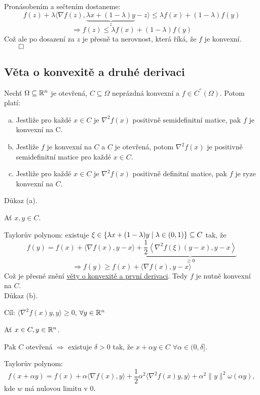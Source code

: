 Pronásobením a sečtením dostaneme:
\[
    f(z) + \lambda \langle \nabla f(z), \underbrace{\lambda x + (1-\lambda)y}_{z} - z\rangle \leq \lambda f(x) + 
    (1-\lambda)f(y)
\]
\[
    \Rightarrow f(z) \leq \lambda f(x) + (1-\lambda)f(y)
\]
Což ale po dosazení za $z$ je přesně ta nerovnost, která říká, že $f$ je konvexní. $\qed$

\subsection{Věta o konvexitě a druhé derivaci}\label{konvDDeriv}
Nechť $\Omega \subseteq \mathbb{R}^n$ je otevřená, $C \subseteq \Omega$ neprázdná konvexní a $f \in C^{''} (\Omega)$. Potom platí:
\begin{enumerate}[(a)]
    \item Jestliže pro každé $x \in C$ je $\nabla^2 f(x)$ positivně semidefinitní matice, pak $f$ je konvexní na C.
    \item Jestliže $f$ je konvexní na $C$ a $C$ je otevřená, potom $\nabla^2 f(x)$ je positivně semidefinitní matice pro 
    každé $x \in C$.
    \item Jestliže pro každé $x \in C$ je $\nabla^2 f(x)$ positivně definitní matice, pak $f$ je ryze konvexní na $C$. 
\end{enumerate}

Důkaz (a).

Ať $x, y \in C$.

Taylorův polynom: existuje $\xi \in \left\lbrace \lambda x + (1-\lambda)y \mid \lambda \in (0,1) \right\rbrace \subseteq C$ tak, že
\[
    f(y) = f(x) + \langle \nabla f(x), y-x\rangle + \underbrace{\frac{1}{2} \left\langle \nabla^2 f(\xi) (y-x), 
    y-x\right\rangle}_{\geq 0}
\]
\[
    \Rightarrow f(y) \geq f(x) + \langle \nabla f(x), y-x\rangle
\]
Což je přesné znění \hyperref[konvDeriv]{věty o konvexitě a první derivaci}. Tedy $f$ je nutně konvexní na $C$. 
\\

\newpage
Důkaz (b).

Cíl: $\langle \nabla^2 f(x)y, y\rangle \geq 0$, $\forall y \in \mathbb{R}^n$

Ať $x \in C, y \in \mathbb{R}^n$.

Pak
$C$ otevřená $\Rightarrow$ existuje $\delta > 0$ tak, že $x + \alpha y \in C$ $\forall \alpha \in (0, \delta]$.

Taylorův polynom: 
\[
    f(x+ \alpha y) = f(x) + \alpha \langle \nabla f(x), y\rangle + \frac{1}{2}\alpha^2 \langle \nabla^2 f(x)y, y\rangle
    + \alpha^2 \| y\|^2 \omega(\alpha y),
\]
kde $w$ má nulovou limitu v $0$.

